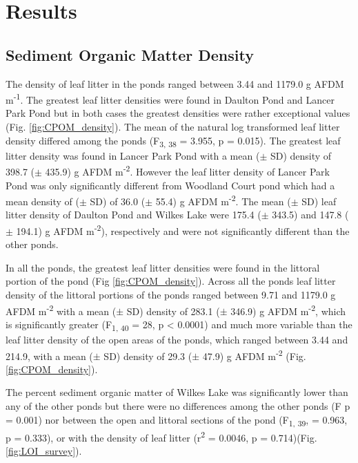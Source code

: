 \section{Results}
\subsection{Sediment Organic Matter Density}

The density of leaf litter in the ponds ranged between 3.44 and 1179.0 g AFDM m\textsuperscript{-1}. The greatest leaf litter densities were found in Daulton Pond and Lancer Park Pond but in both cases the greatest densities were rather exceptional values (Fig. \ref{fig:CPOM_density}). The mean of the natural log transformed leaf litter density differed among the ponds (F\textsubscript{3, 38} = 3.955, p = 0.015). The greatest leaf litter density was found in Lancer Park Pond with a mean ($\pm$ SD) density of 398.7 ($\pm$ 435.9) g AFDM m\textsuperscript{-2}. However the leaf litter density of Lancer Park Pond was only significantly different from Woodland Court pond which had a mean density of ($\pm$ SD) of 36.0 ($\pm$ 55.4) g AFDM m\textsuperscript{-2}. The mean ($\pm$ SD) leaf litter density of Daulton Pond and Wilkes Lake were 175.4 ($\pm$ 343.5) and 147.8 ($\pm$ 194.1) g AFDM m\textsuperscript{-2}), respectively and were not significantly different than the other ponds. 

In all the ponds, the greatest leaf litter densities were found in the littoral portion of the pond (Fig \ref{fig:CPOM_density}). Across all the ponds leaf litter density of the littoral portions of the ponds ranged between 9.71 and 1179.0 g AFDM m\textsuperscript{-2} with a mean ($\pm$ SD) density of 283.1 ($\pm$ 346.9) g AFDM m\textsuperscript{-2}, which is significantly greater (F\textsubscript{1, 40} = 28, p < 0.0001) and much more variable than the leaf litter density of the open areas of the ponds, which ranged between 3.44 and 214.9, with a mean ($\pm$ SD) density of 29.3 ($\pm$ 47.9) g AFDM m\textsuperscript{-2} (Fig. \ref{fig:CPOM_density}). 

The percent sediment organic matter of Wilkes Lake was significantly lower than any of the other ponds but there were no differences among the other ponds (F p = 0.001) nor between the open and littoral sections of the pond (F\textsubscript{1, 39}, = 0.963, p = 0.333), or with the density of leaf litter (r\textsuperscript{2} = 0.0046, p = 0.714)(Fig. \ref{fig:LOI_survey}). 

  

  

